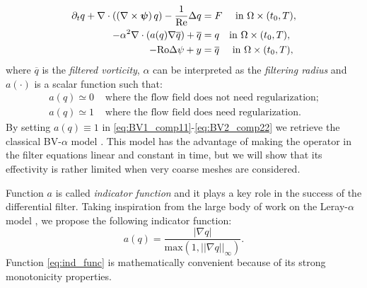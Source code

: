 \documentclass[11pt,a4paper]{article}
\begin{document}
\begin{align}%
\dt q+ \div \left(\left(\nabla \times \bm{\psi}\right) q \right) - \dfrac{1}{\text{Re}} \Delta q &= F \quad \mbox{ in }\Omega \times (t_0,T), \label{eq:BV1_comp11}\\
-\alpha^2\div \left(a(q) \nabla\overline{q}\right) +\overline{q} &= q  \quad {\rm in}~\Omega \times
(t_0,T), \label{eq:BV2_comp33} \\
-\text{Ro} \Delta \psi + y &= \overline{q} \quad \mbox{ in }\Omega \times (t_0,T), \label{eq:BV2_comp22}
\end{align}
where $\overline{q}$ is the \emph{filtered vorticity}, $\alpha$ can be interpreted as the \emph{filtering radius} 
and $a(\cdot)$ is a scalar function such that:
\begin{align*}
a(q)\simeq 0 & \mbox{ where the flow field does not need regularization;}\\
a(q)\simeq 1 & \mbox{ where the flow field does need regularization.}
\end{align*}
By setting $a(q)\equiv 1$ in  \eqref{eq:BV1_comp11}-\eqref{eq:BV2_comp22} we retrieve
the classical BV-$\alpha$ model \cite{Nadiga2001, Holm2003, Monteiro2015, Monteiro2014}. 
This model has the advantage of making the operator in the filter equations linear and constant in time, 
but we will show that its effectivity is rather limited when very coarse meshes are considered. %


Function $a$ is called \emph{indicator function} and it plays a key role in the success of the differential filter.
Taking inspiration from the large body of work on the Leray-$\alpha$ model \cite{Borggaard2009,layton_CMAME,O-hunt1988,Vreman2004,Bowers2012}, 
we propose the following indicator function:
\begin{equation}
a(q) = \dfrac{|\nabla q|}{\text{max}\left(1, ||\nabla q||_\infty\right)}. \label{eq:ind_func}
\end{equation}
Function \eqref{eq:ind_func} is mathematically convenient because of its strong monotonicity properties. 
\end{document}
